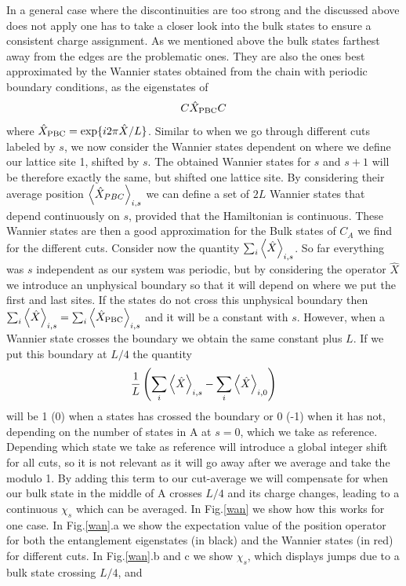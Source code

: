 \documentclass[twocolumn,amsmath,longbibliography,amssymb,superscriptaddress]{revtex4-1}
\begin{document}
In a general case where the discontinuities are too strong and the discussed above does not apply one has to take a closer look into the bulk states to ensure a consistent charge assignment. As we mentioned above the bulk states farthest away from the edges are the problematic ones. They are also the ones best approximated by the Wannier states obtained from the chain with periodic boundary conditions, as the eigenstates of 
\begin{equation}
C\hat{X}_{\rm PBC}C
\end{equation}
where $\hat{X}_{\rm PBC} = \exp\{i 2\pi \hat{X}/L\}$. Similar to when we go through different cuts labeled by $s$, we now consider the Wannier states dependent on where we define our lattice site 1, shifted by $s$. The obtained Wannier states for $s$ and $s+1$ will be therefore exactly the same, but shifted one lattice site. By considering their average position $\expval{\hat{X}_{PBC}}_{i,s}$ we can define a set of $2L$ Wannier states that depend continuously on $s$, provided that the Hamiltonian is continuous. These Wannier states are then a good approximation for the Bulk states of $C_A$ we find for the different cuts. 
Consider now the quantity $\sum_i\expval{\hat{X}}_{i,s}$. So far everything was $s$ independent as our system was periodic, but by considering the operator $\hat{X}$ we introduce an unphysical boundary so that it will depend on where we put the first and last sites. If the states do not cross this unphysical boundary then $\sum_i\expval{\hat{X}}_{i,s} = \sum_i\expval{\hat{X}_{\rm PBC}}_{i,s} $ and it will be a constant with $s$. However, when a Wannier state crosses the boundary we obtain the same constant plus $L$. If we put this boundary at $L/4$ the quantity 
\begin{equation}
\frac{1}{L}\left(\sum_i\expval{\hat{X}}_{i,s}-\sum_i\expval{\hat{X}}_{i,0}\right)
\end{equation}
will be 1 (0) when a states has crossed the boundary or 0 (-1) when it has not, depending on the number of states in A at $s=0$, which we take as reference. Depending which state we take as reference will introduce a global integer shift for all cuts, so it is not relevant as it will go away after we average and take the modulo 1. By adding this term to our cut-average we will compensate for when our bulk state in the middle of A crosses $L/4$ and its charge changes, leading to a continuous $\chi_s$ which can be averaged. In Fig.\ref{wan} we show how this works for one case. In Fig.\ref{wan}.a we show the expectation value of the position operator for both the entanglement eigenstates (in black) and the Wannier states (in red) for different cuts. In Fig.\ref{wan}.b and c we show $\chi_s$, which displays jumps due to a bulk state crossing $L/4$, and 
\end{document}
